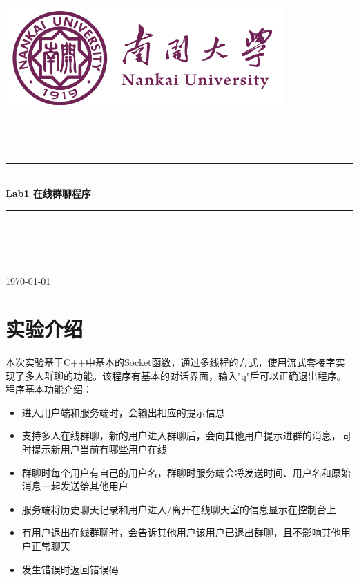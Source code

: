\documentclass[UTF8,a4paper,10pt]{ctexart}
\newcommand{\HRule}{\rule{\linewidth}{0.5mm}}%
\begin{document}
\begin{titlepage}
    \begin{center}
    \includegraphics[width=0.8\textwidth]{NKU.png}\\[1cm]    
    \textsc{\Huge {} }\\[0.9cm]
    \textsc{\huge {}}\\[0.9cm]
    \textsc{\huge {}}\\[0.8cm]
    \HRule \\[0.9cm]
    { \LARGE \bfseries Lab1 在线群聊程序}\\[0.4cm]
    \HRule \\[2.0cm]
    \centering
    \textsc{\LARGE {}}\\[0.5cm]
    \textsc{\LARGE {}}\\[0.5cm]
    \textsc{\LARGE {}}\\[0.5cm]
    \vfill
    {\Large \today}
    \end{center}
\end{titlepage}



\newpage

\tableofcontents
\setcounter{page}{1}



\section{实验介绍}
本次实验基于C++中基本的Socket函数，通过多线程的方式，使用流式套接字实现了多人群聊的功能。该程序有基本的对话界面，输入"q"后可以正确退出程序。程序基本功能介绍：\par



\begin{itemize}
\item 进入用户端和服务端时，会输出相应的提示信息
\item 支持多人在线群聊，新的用户进入群聊后，会向其他用户提示进群的消息，同时提示新用户当前有哪些用户在线
\item 群聊时每个用户有自己的用户名，群聊时服务端会将发送时间、用户名和原始消息一起发送给其他用户
\item 服务端将历史聊天记录和用户进入/离开在线聊天室的信息显示在控制台上
\item 有用户退出在线群聊时，会告诉其他用户该用户已退出群聊，且不影响其他用户正常聊天
\item 发生错误时返回错误码
\end{itemize}
\end{document}
